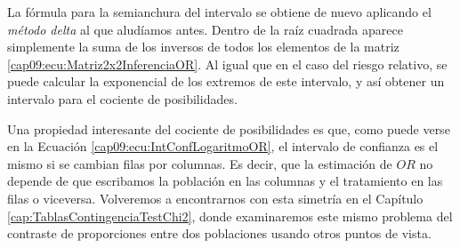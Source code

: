 \begin{center}
\end{center}
La fórmula para la semianchura del intervalo se obtiene de nuevo aplicando el {\em método delta} al que aludíamos antes. Dentro de la raíz cuadrada aparece simplemente la suma de los inversos de todos los elementos de la matriz \ref{cap09:ecu:Matriz2x2InferenciaOR}. Al igual que en el caso del riesgo relativo, se puede calcular la exponencial de los extremos de este intervalo, y así obtener un intervalo para el cociente de posibilidades.

Una propiedad interesante del cociente de posibilidades es que, como puede verse en la Ecuación \ref{cap09:ecu:IntConfLogaritmoOR}, el intervalo de confianza es el mismo si se cambian filas por columnas. Es decir, que la estimación de $OR$ no depende de que escribamos la población en las columnas y el tratamiento en las filas o viceversa. Volveremos a encontrarnos con esta simetría en el Capítulo \ref{cap:TablasContingenciaTestChi2}, donde examinaremos este mismo problema del contraste de proporciones entre dos poblaciones usando otros puntos de vista.


